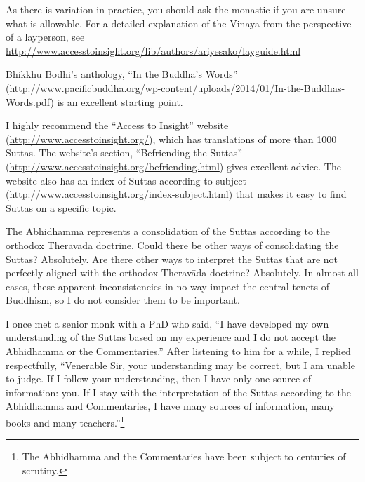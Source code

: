 As there is variation in practice, you should ask the monastic if you are unsure what is allowable. For a detailed explanation of the Vinaya from the perspective of a layperson, see \url{http://www.accesstoinsight.org/lib/authors/ariyesako/layguide.html}


Bhikkhu Bodhi’s anthology, “In the Buddha’s Words” (\url{http://www.pacificbuddha.org/wp-content/uploads/2014/01/In-the-Buddhas-Words.pdf}) is an excellent starting point. 

I highly recommend the “Access to Insight” website (\url{http://www.accesstoinsight.org/}), which has translations of more than 1000 Suttas. The website’s section, “Befriending the Suttas” (\url{http://www.accesstoinsight.org/befriending.html}) gives excellent advice. The website also has an index of Suttas according to subject (\url{http://www.accesstoinsight.org/index-subject.html}) that makes it easy to find Suttas on a specific topic.


The Abhidhamma represents a consolidation of the Suttas according to the orthodox Theravāda doctrine. Could there be other ways of consolidating the Suttas? Absolutely. Are there other ways to interpret the Suttas that are not perfectly aligned with the orthodox Theravāda doctrine? Absolutely. In almost all cases, these apparent inconsistencies in no way impact the central tenets of Buddhism, so I do not consider them to be important.

I once met a senior monk with a PhD who said, “I have developed my own understanding of the Suttas based on my experience and I do not accept the Abhidhamma or the Commentaries.” After listening to him for a while, I replied respectfully, “Venerable Sir, your understanding may be correct, but I am unable to judge. If I follow your understanding, then I have only one source of information: you. If I stay with the interpretation of the Suttas according to the Abhidhamma and Commentaries, I have many sources of information, many books and many teachers.”\footnote{The Abhidhamma and the Commentaries have been subject to centuries of scrutiny.}


